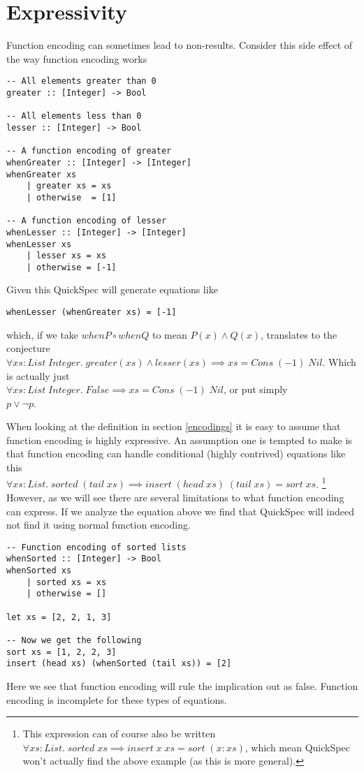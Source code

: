 \section{Expressivity}

Function encoding can sometimes lead to non-results.
Consider this side effect
of the way function encoding works
\begin{verbatim}-- All elements greater than 0
greater :: [Integer] -> Bool

-- All elements less than 0 
lesser :: [Integer] -> Bool

-- A function encoding of greater
whenGreater :: [Integer] -> [Integer]
whenGreater xs
    | greater xs = xs
    | otherwise  = [1]

-- A function encoding of lesser 
whenLesser :: [Integer] -> [Integer]
whenLesser xs
    | lesser xs = xs
    | otherwise = [-1]\end{verbatim}
Given this QuickSpec will generate equations like
\begin{verbatim}whenLesser (whenGreater xs) = [-1]\end{verbatim}
which, if we take $whenP\circ whenQ$ to mean $P(x)\wedge Q(x)$,  translates to the conjecture\\
$\forall xs : List\; Integer.\; greater(xs)\wedge lesser(xs)\implies xs = Cons\; (-1)\; Nil$.
Which is actually just\\$\forall xs : List\; Integer.\; False\implies xs = Cons\; (-1)\; Nil$,
or put simply\\$p\vee \neg p$.

When looking at the definition in 
section \ref{encodings} it is easy to assume
that function encoding is highly expressive.
An assumption one is tempted to make is that
function encoding can handle conditional (highly contrived)
equations like this\\
$\forall xs : List.\;sorted\;(tail\; xs) \implies insert\;(head\;xs)\;(tail\;xs)=sort\;xs$.
\footnote{This expression can of course also be written
$\forall xs : List.\;sorted\;xs \implies insert\;x\;xs=sort\;(x:xs)$,
which mean QuickSpec won't actually find the above example (as this is more general).}
However, as we will see there are several limitations to what function encoding can express.
If we analyze the equation above we find that QuickSpec will indeed not find it
using normal function encoding.
\begin{verbatim}-- Function encoding of sorted lists
whenSorted :: [Integer] -> Bool
whenSorted xs
    | sorted xs = xs
    | otherwise = []

let xs = [2, 2, 1, 3]

-- Now we get the following
sort xs = [1, 2, 2, 3]
insert (head xs) (whenSorted (tail xs)) = [2]\end{verbatim}
Here we see that function encoding will rule the implication out as false. Function encoding is
incomplete for these types of equations.

